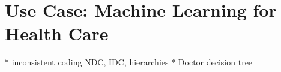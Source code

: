 \section{Use Case: Machine Learning for Health Care}
* inconsistent coding NDC, IDC, hierarchies
* Doctor decision tree